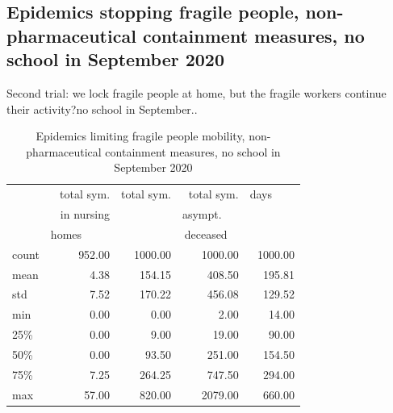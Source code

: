 \documentclass[11pt]{article}
\begin{document}
\subsection{Epidemics stopping fragile people, non-pharmaceutical containment measures, no school in September 2020}
\label{EpidemicsFragileS}


Second trial: we lock fragile people at home, but the fragile workers continue their activity?no school in September..

\begin{table}[H]
\center
\small
\begin{tabular}{lrrrr}
\toprule
{} & total sym.        &  total sym. & total sym.     & days~~~~ \\
{} & in nursing        &                  & asympt.~~~  & \\
{} & homes~~~~~  &                  & deceased~~ & \\
\midrule
count &     952.00 &             1000.00 &                 1000.00 & 1000.00 \\
mean  &       4.38 &              154.15 &                  408.50 &  195.81 \\
std   &       7.52 &              170.22 &                  456.08 &  129.52 \\
min   &       0.00 &                0.00 &                    2.00 &   14.00 \\
25\%   &       0.00 &                9.00 &                   19.00 &   90.00 \\
50\%   &       0.00 &               93.50 &                  251.00 &  154.50 \\
75\%   &       7.25 &              264.25 &                  747.50 &  294.00 \\
max   &      57.00 &              820.00 &                 2079.00 &  660.00 \\
\bottomrule
\end{tabular}

\label{EpidemicsFragileT}
\caption{Epidemics limiting fragile people mobility, non-pharmaceutical containment measures, no school in September 2020}
\end{table}
\end{document}
